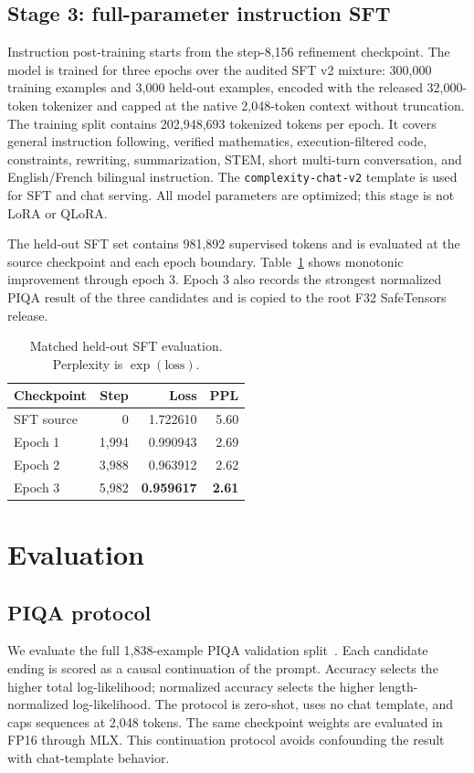 \documentclass[10pt,twocolumn]{article}
\newcommand{\code}[1]{\texttt{#1}}
\begin{document}
\subsection{Stage 3: full-parameter instruction SFT}
Instruction post-training starts from the step-8,156 refinement checkpoint. The model is trained for three epochs over the audited SFT v2 mixture: 300,000 training examples and 3,000 held-out examples, encoded with the released 32,000-token tokenizer and capped at the native 2,048-token context without truncation. The training split contains 202,948,693 tokenized tokens per epoch. It covers general instruction following, verified mathematics, execution-filtered code, constraints, rewriting, summarization, STEM, short multi-turn conversation, and English/French bilingual instruction. The \code{complexity-chat-v2} template is used for SFT and chat serving. All model parameters are optimized; this stage is not LoRA or QLoRA.

The held-out SFT set contains 981,892 supervised tokens and is evaluated at the source checkpoint and each epoch boundary. Table~\ref{tab:sftloss} shows monotonic improvement through epoch 3. Epoch 3 also records the strongest normalized PIQA result of the three candidates and is copied to the root F32 SafeTensors release.

\begin{table}[t]
\centering
\caption{Matched held-out SFT evaluation. Perplexity is $\exp(\mathrm{loss})$.}
\label{tab:sftloss}
\small
\begin{tabular}{@{}lrrr@{}}
\toprule
Checkpoint & Step & Loss & PPL \\
\midrule
SFT source & 0 & 1.722610 & 5.60 \\
Epoch 1 & 1,994 & 0.990943 & 2.69 \\
Epoch 2 & 3,988 & 0.963912 & 2.62 \\
Epoch 3 & 5,982 & \textbf{0.959617} & \textbf{2.61} \\
\bottomrule
\end{tabular}
\end{table}

\section{\hspace{0.3em}Evaluation}
\subsection{PIQA protocol}
We evaluate the full 1,838-example PIQA validation split~\cite{bisk2020piqa}. Each candidate ending is scored as a causal continuation of the prompt. Accuracy selects the higher total log-likelihood; normalized accuracy selects the higher length-normalized log-likelihood. The protocol is zero-shot, uses no chat template, and caps sequences at 2,048 tokens. The same checkpoint weights are evaluated in FP16 through MLX. This continuation protocol avoids confounding the result with chat-template behavior.
\end{document}
